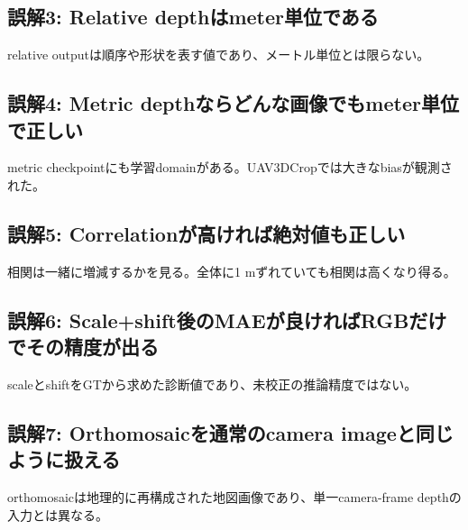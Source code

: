 \documentclass[a4paper,11pt]{ltjsarticle}
\begin{document}
\subsection{誤解3: Relative depthはmeter単位である}
relative outputは順序や形状を表す値であり、メートル単位とは限らない。
\subsection{誤解4: Metric depthならどんな画像でもmeter単位で正しい}
metric checkpointにも学習domainがある。UAV3DCropでは大きなbiasが観測された。
\subsection{誤解5: Correlationが高ければ絶対値も正しい}
相関は一緒に増減するかを見る。全体に1 mずれていても相関は高くなり得る。
\subsection{誤解6: Scale+shift後のMAEが良ければRGBだけでその精度が出る}
scaleとshiftをGTから求めた診断値であり、未校正の推論精度ではない。
\subsection{誤解7: Orthomosaicを通常のcamera imageと同じように扱える}
orthomosaicは地理的に再構成された地図画像であり、単一camera-frame depthの入力とは異なる。
\end{document}
